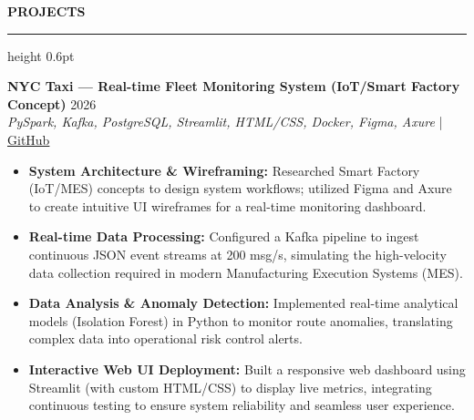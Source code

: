 ﻿\documentclass{resume}
\renewcommand{\sectionskip}{\vspace{5pt}}
\renewcommand{\sectionlineskip}{\vspace{3pt}}
\renewenvironment{rSection}[1]{
  \sectionskip
  {\color{headerblue}\textbf{\MakeUppercase{#1}}}
  \sectionlineskip
  {\color{rulegray}\hrule height 0.6pt}
  \vspace{0pt}
  \begin{list}{}{
    \setlength{\leftmargin}{0em}
    \setlength{\topsep}{0pt}
    \setlength{\partopsep}{0pt}
    \setlength{\parsep}{0pt}
    \setlength{\itemsep}{0pt}
  }
  \item[]
}{
  \end{list}
}
\begin{document}
\begin{rSection}{Projects}
    \item \textbf{NYC Taxi — Real-time Fleet Monitoring System (IoT/Smart Factory Concept)} \hfill 2026\\
    {\small \textit{PySpark, Kafka, PostgreSQL, Streamlit, HTML/CSS, Docker, Figma, Axure}} \hfill | \href{https://github.com/vietpham10205/real-time-Fleet-Intelligence-anomaly-detection-dashboard}{GitHub}
    {\small
    \begin{itemize}[itemsep=4pt, parsep=0pt, leftmargin=1.2em]
        \item \textbf{System Architecture \& Wireframing:} Researched Smart Factory (IoT/MES) concepts to design system workflows; utilized Figma and Axure to create intuitive UI wireframes for a real-time monitoring dashboard.
        \item \textbf{Real-time Data Processing:} Configured a Kafka pipeline to ingest continuous JSON event streams at 200 msg/s, simulating the high-velocity data collection required in modern Manufacturing Execution Systems (MES).
        \item \textbf{Data Analysis \& Anomaly Detection:} Implemented real-time analytical models (Isolation Forest) in Python to monitor route anomalies, translating complex data into operational risk control alerts.
        \item \textbf{Interactive Web UI Deployment:} Built a responsive web dashboard using Streamlit (with custom HTML/CSS) to display live metrics, integrating continuous testing to ensure system reliability and seamless user experience.
    \end{itemize}
    }
\end{rSection}
\end{document}
